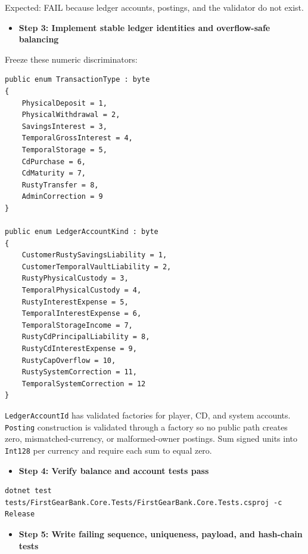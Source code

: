 \documentclass[
  10pt,
  letterpaper,
]{article}
\newcommand{\passthrough}[1]{#1}
\providecommand{\tightlist}{%
  \setlength{\itemsep}{0pt}\setlength{\parskip}{0pt}}
\begin{document}
Expected: FAIL because ledger accounts, postings, and the validator do
not exist.

\begin{itemize}
\tightlist
\item[$\square$]
  \textbf{Step 3: Implement stable ledger identities and overflow-safe
  balancing}
\end{itemize}

Freeze these numeric discriminators:

\begin{lstlisting}
public enum TransactionType : byte
{
    PhysicalDeposit = 1,
    PhysicalWithdrawal = 2,
    SavingsInterest = 3,
    TemporalGrossInterest = 4,
    TemporalStorage = 5,
    CdPurchase = 6,
    CdMaturity = 7,
    RustyTransfer = 8,
    AdminCorrection = 9
}

public enum LedgerAccountKind : byte
{
    CustomerRustySavingsLiability = 1,
    CustomerTemporalVaultLiability = 2,
    RustyPhysicalCustody = 3,
    TemporalPhysicalCustody = 4,
    RustyInterestExpense = 5,
    TemporalInterestExpense = 6,
    TemporalStorageIncome = 7,
    RustyCdPrincipalLiability = 8,
    RustyCdInterestExpense = 9,
    RustyCapOverflow = 10,
    RustySystemCorrection = 11,
    TemporalSystemCorrection = 12
}
\end{lstlisting}

\passthrough{\lstinline!LedgerAccountId!} has validated factories for
player, CD, and system accounts. \passthrough{\lstinline!Posting!}
construction is validated through a factory so no public path creates
zero, mismatched-currency, or malformed-owner postings. Sum signed units
into \passthrough{\lstinline!Int128!} per currency and require each sum
to equal zero.

\begin{itemize}
\tightlist
\item[$\square$]
  \textbf{Step 4: Verify balance and account tests pass}
\end{itemize}

\begin{lstlisting}
dotnet test tests/FirstGearBank.Core.Tests/FirstGearBank.Core.Tests.csproj -c Release
\end{lstlisting}

\begin{itemize}
\tightlist
\item[$\square$]
  \textbf{Step 5: Write failing sequence, uniqueness, payload, and
  hash-chain tests}
\end{itemize}
\end{document}
